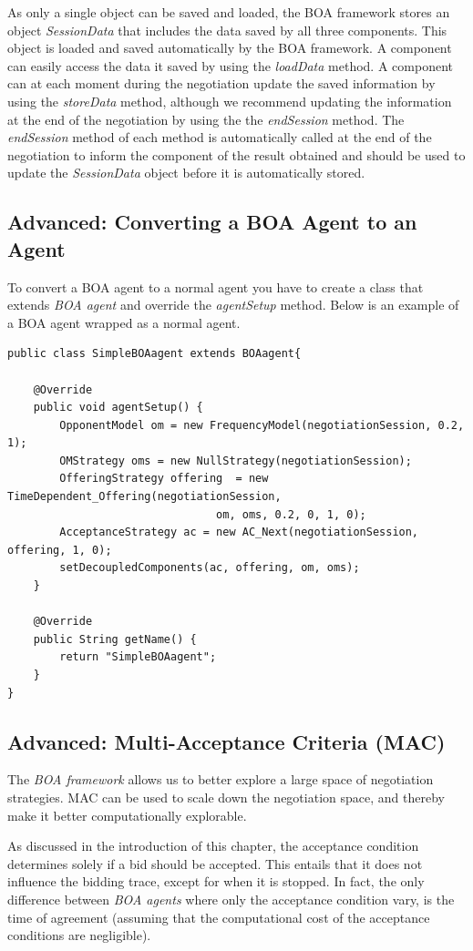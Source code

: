 \documentclass[]{article}
\begin{document}
As only a single object can be saved and loaded, the BOA framework stores an object \textit{SessionData} that includes the data saved by all three components. This object is loaded and saved automatically by the BOA framework. A component can easily access the data it saved by using the \textit{loadData} method. A component can at each moment during the negotiation update the saved information by using the \textit{storeData} method, although we recommend updating the information at the end of the negotiation by using the the \textit{endSession} method. The \textit{endSession} method of each method is automatically called at the end of the negotiation to inform the component of the result obtained and should be used to update the \textit{SessionData} object before it is automatically stored.

\subsection{Advanced: Converting a BOA Agent to an Agent}
To convert a BOA agent to a normal agent you have to create a class that extends \textit{BOA agent} and override the \textit{agentSetup} method. Below is an example of a BOA agent wrapped as a normal agent.

\begin{lstlisting}
public class SimpleBOAagent extends BOAagent{

	@Override
	public void agentSetup() {
		OpponentModel om = new FrequencyModel(negotiationSession, 0.2, 1);
		OMStrategy oms = new NullStrategy(negotiationSession);
		OfferingStrategy offering  = new TimeDependent_Offering(negotiationSession,
								om, oms, 0.2, 0, 1, 0);
		AcceptanceStrategy ac = new AC_Next(negotiationSession, offering, 1, 0);
		setDecoupledComponents(ac, offering, om, oms);		
	}

	@Override
	public String getName() {
		return "SimpleBOAagent";
	}
}
\end{lstlisting}

\subsection{Advanced: Multi-Acceptance Criteria (MAC)}
The \textit{BOA framework} allows us to better explore a large space of negotiation strategies. MAC can be used to scale down the negotiation space, and thereby make it better computationally explorable.

As discussed in the introduction of this chapter, the acceptance condition determines solely if a bid should be accepted. This entails that it does not influence the bidding trace, except for when it is stopped. In fact, the only difference between \textit{BOA agents} where only the acceptance condition vary, is the time of agreement (assuming that the computational cost of the acceptance conditions are negligible).
\end{document}
